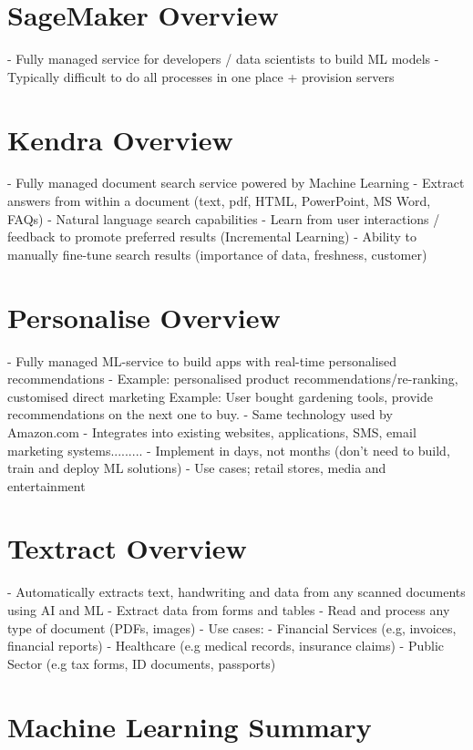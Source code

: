 \documentclass[11pt]{book}
\begin{document}
    \section{SageMaker Overview}
    - Fully managed service for developers / data scientists to build ML models
    - Typically difficult to do all processes in one place + provision servers


    \section{Kendra Overview}
    - Fully managed document search service powered by Machine Learning
    - Extract answers from within a document (text, pdf, HTML, PowerPoint, MS Word, FAQs)
    - Natural language search capabilities
    - Learn from user interactions / feedback to promote preferred results (Incremental Learning)
    - Ability to manually fine-tune search results (importance of data, freshness, customer)


    \section{Personalise Overview}
    - Fully managed ML-service to build apps with real-time personalised recommendations
    - Example: personalised product recommendations/re-ranking, customised direct marketing
    Example: User bought gardening tools, provide recommendations on the next one to buy.
    - Same technology used by Amazon.com
    - Integrates into existing websites, applications, SMS, email marketing systems.........
    - Implement in days, not months (don't need to build, train and deploy ML solutions)
    - Use cases; retail stores, media and entertainment


    \section{Textract Overview}
    - Automatically extracts text, handwriting and data from any scanned documents using AI and ML
    - Extract data from forms and tables
    - Read and process any type of document (PDFs, images)
    - Use cases:
    - Financial Services (e.g, invoices, financial reports)
    - Healthcare (e.g medical records, insurance claims)
    - Public Sector (e.g tax forms, ID documents, passports)


    \section{Machine Learning Summary}
\end{document}

